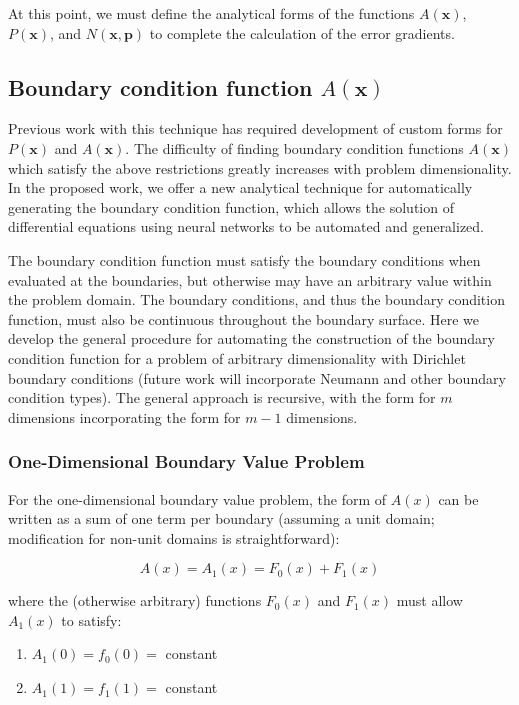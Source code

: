 \documentclass{article}
\begin{document}
At this point, we must define the analytical forms of the functions $A(\mathbf x)$, $P(\mathbf x)$, and $N(\mathbf x,\mathbf p)$ to complete the calculation of the error gradients.

\subsection{Boundary condition function $A(\mathbf x)$}

Previous work with this technique has required development of custom forms for $P(\mathbf x)$ and $A(\mathbf x)$. The difficulty of finding boundary condition functions $A(\mathbf x)$ which satisfy the above restrictions greatly increases with problem dimensionality. In the proposed work, we offer a new analytical technique for automatically generating the boundary condition function, which allows the solution of differential equations using neural networks to be automated and generalized.

The boundary condition function must satisfy the boundary conditions when evaluated at the boundaries, but otherwise may have an arbitrary value within the problem domain. The boundary conditions, and thus the boundary condition function, must also be continuous throughout the boundary surface. Here we develop the general procedure for automating the construction of the boundary condition function for a problem of arbitrary dimensionality with Dirichlet boundary conditions (future work will incorporate Neumann and other boundary condition types). The general approach is recursive, with the form for $m$ dimensions incorporating the form for $m-1$ dimensions.

\subsubsection{One-Dimensional Boundary Value Problem}

For the one-dimensional boundary value problem, the form of $A(x)$ can be written as a sum of one term per boundary (assuming a unit domain; modification for non-unit domains is straightforward):

\begin{equation}
  A(x) = A_1(x) = F_0(x) + F_1(x)
\end{equation}

\noindent where the (otherwise arbitrary) functions $F_0(x)$ and $F_1(x)$ must allow $A_1(x)$ to satisfy:

\begin{enumerate}
  \item $A_1(0) = f_0(0) = $ constant
  \item $A_1(1) = f_1(1) = $ constant
\end{enumerate}
\end{document}

